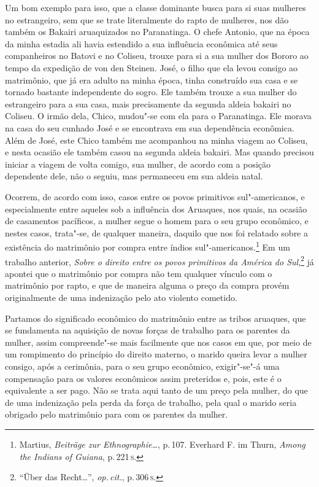 Um bom exemplo para isso, que a classe dominante busca para si suas
mulheres no estrangeiro, sem que se trate literalmente do rapto de
mulheres, nos dão também os Bakairi aruaquizados no Paranatinga. O
chefe Antonio, que na época da minha estadia ali havia estendido a sua
influência econômica até seus companheiros no Batovi e no Coliseu,
trouxe para si a sua mulher dos Bororo ao tempo da expedição de von den
Steinen. José, o filho que ela levou consigo ao matrimônio, que já era
adulto na minha época, tinha construído sua casa e se tornado bastante
independente do sogro. Ele também trouxe a sua mulher do estrangeiro
para a sua casa, mais precisamente da segunda aldeia bakairi no Coliseu.
O irmão dela, Chico, mudou"-se com ela para o Paranatinga. Ele morava na
casa do seu cunhado José e se encontrava em sua dependência econômica.
Além de José, este Chico também me acompanhou na minha viagem ao
Coliseu, e nesta ocasião ele também casou na segunda aldeia bakairi. Mas
quando precisou iniciar a viagem de volta comigo, sua mulher, de
acordo com a posição dependente dele, não o seguiu, mas permaneceu em
sua aldeia natal.

Ocorrem, de acordo com isso, casos entre os povos primitivos
sul"-americanos, e especialmente entre aqueles sob a influência dos
Aruaques, nos quais, na ocasião de casamentos pacíficos, a mulher segue
o homem para o seu grupo econômico, e nestes casos, trata"-se, de
qualquer maneira, daquilo que nos foi relatado sobre a existência do
matrimônio por compra entre índios
sul"-americanos.\footnote{Martius, \textit{Beiträge zur Ethnographie\ldots}, p.\,107. Everhard F. im
  Thurn, \textit{Among the Indians of Guiana}, p.\,221\,\textsc{s}.} Em um trabalho
anterior, \textit{Sobre o direito entre os povos primitivos da América do
Sul},\footnote{``Über das Recht\ldots'', \textit{op.\,cit.}, p.\,306\,\textsc{s}.} já apontei que o
matrimônio por compra não tem qualquer vínculo com o matrimônio por
rapto, e que de maneira alguma o preço da compra provém originalmente de
uma indenização pelo ato violento cometido. 

Partamos do significado
econômico do matrimônio entre as tribos aruaques, que se fundamenta na
aquisição de novas forças de trabalho para os parentes da mulher, assim
compreende"-se mais facilmente que nos casos em que, por meio de um
rompimento do princípio do direito materno, o marido queira levar a mulher
consigo, após a cerimônia, para o seu grupo econômico, exigir"-se"-á uma
compensação para os valores econômicos assim preteridos e, pois, este é
o equivalente a ser pago. Não se trata aqui tanto de um preço pela
mulher, do que de uma indenização pela perda da força de trabalho, pela
qual o marido seria obrigado pelo matrimônio para com os parentes da
mulher.

